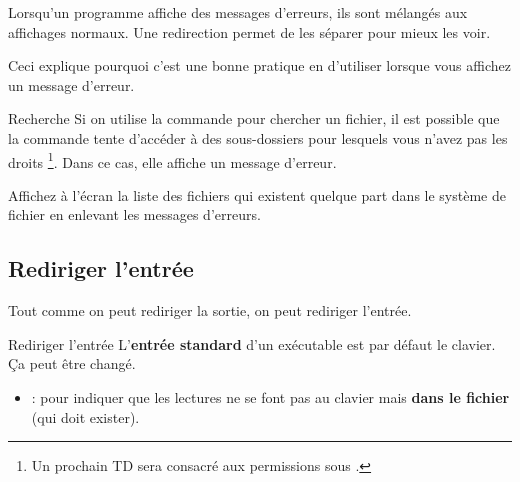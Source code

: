\documentclass[a4paper,11pt]{style-esi/td}
\begin{document}
		Lorsqu'un programme affiche des messages d'erreurs,
		ils sont mélangés aux affichages normaux.
		Une redirection permet de les séparer pour mieux les voir.

		Ceci explique pourquoi c'est une bonne pratique en 
		d'utiliser  lorsque vous affichez un message d'erreur.

		\begin{Exercice}{Recherche}
			Si on utilise la commande  pour chercher un fichier,
			il est possible que la commande tente d'accéder à des sous-dossiers
			pour lesquels vous n'avez pas les droits%
			\footnote{%
				Un prochain TD sera consacré aux permissions sous .
			}.
			Dans ce cas, elle affiche un message d'erreur.

			Affichez à l'écran la liste des fichiers 
			qui existent quelque part dans le système de fichier
			en enlevant les messages d'erreurs.
		\end{Exercice}

	\subsection{Rediriger l'entrée}

		Tout comme on peut rediriger la sortie,
		on peut rediriger l'entrée.

		\begin{theorie}{Rediriger l'entrée}
			L'\textbf{entrée standard} d'un exécutable est par défaut le clavier.
			\c Ca peut être changé. 
			\begin{itemize}
			\item {} : 
				pour indiquer que les lectures ne se font pas au clavier
				mais \textbf{dans le fichier} (qui doit exister).
			\end{itemize}
		\end{theorie}
\end{document}
